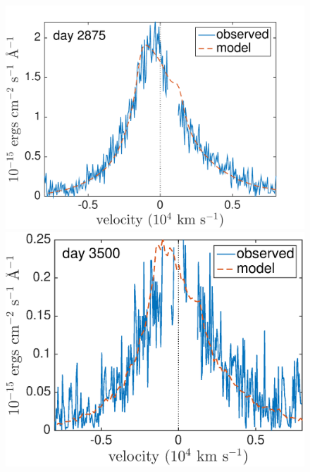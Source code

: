 \begin{figure}
\includegraphics[trim =0 0 0 0,clip=true,scale=0.37]{chapters/chapter5/images/smooth/best_fit/d2875Ha.pdf}
\hspace{1mm}
\includegraphics[trim =0 0 0 0,clip=true,scale=0.37]{chapters/chapter5/images/smooth/best_fit/d3500Ha}


\end{figure}
